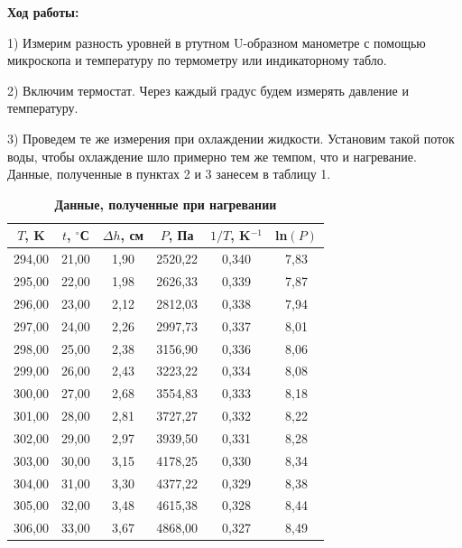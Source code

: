 \documentclass[11pt]{article}
\begin{document}
\par \textbf{Ход работы:}

1) Измерим разность уровней в ртутном U-образном манометре с помощью микроскопа и температуру по термометру или индикаторному табло.

2) Включим термостат. Через каждый градус будем измерять давление и температуру.

3) Проведем те же измерения при охлаждении жидкости. Установим такой поток воды, чтобы охлаждение шло примерно тем же темпом, что и нагревание. Данные, полученные в пунктах 2 и 3 занесем в таблицу 1.

\begin{table}[H]
\centering
\caption{\textbf{Данные, полученные при нагревании}}
\begin{tabular}{|c|c|c|c|c|c|}
\hline
$T$, K & $t$, $^{\circ}$С & $\Delta h$, см & $P$, Па & $1/T$, K$^{-1}$ & ln$(P)$ \\ \hline
294,00 & 21,00            & 1,90           & 2520,22 & 0,340           & 7,83    \\ \hline
295,00 & 22,00            & 1,98           & 2626,33 & 0,339           & 7,87    \\ \hline
296,00 & 23,00            & 2,12           & 2812,03 & 0,338           & 7,94    \\ \hline
297,00 & 24,00            & 2,26           & 2997,73 & 0,337           & 8,01    \\ \hline
298,00 & 25,00            & 2,38           & 3156,90 & 0,336           & 8,06    \\ \hline
299,00 & 26,00            & 2,43           & 3223,22 & 0,334           & 8,08    \\ \hline
300,00 & 27,00            & 2,68           & 3554,83 & 0,333           & 8,18    \\ \hline
301,00 & 28,00            & 2,81           & 3727,27 & 0,332           & 8,22    \\ \hline
302,00 & 29,00            & 2,97           & 3939,50 & 0,331           & 8,28    \\ \hline
303,00 & 30,00            & 3,15           & 4178,25 & 0,330           & 8,34    \\ \hline
304,00 & 31,00            & 3,30           & 4377,22 & 0,329           & 8,38    \\ \hline
305,00 & 32,00            & 3,48           & 4615,38 & 0,328           & 8,44    \\ \hline
306,00 & 33,00            & 3,67           & 4868,00 & 0,327           & 8,49    \\ \hline

\end{tabular}
\end{table}
\end{document}

